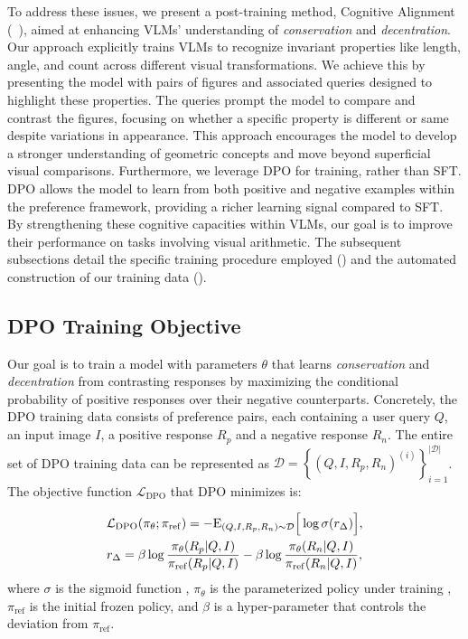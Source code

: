To address these issues, we present a post-training method, Cognitive Alignment (\method~), aimed at enhancing VLMs' understanding of \textit{conservation} and \textit{decentration}. Our approach %
explicitly trains VLMs to recognize invariant properties like length, angle, and count across different visual transformations. We achieve this by presenting the model with pairs of figures and associated queries designed to highlight these properties. The queries prompt the model to compare and contrast the figures, focusing on whether a specific property is different or same despite variations in appearance. This approach encourages the model to develop a stronger understanding of geometric concepts and move beyond superficial visual comparisons.
Furthermore, we leverage DPO \cite{rafailov2023dpo} for training, rather than SFT. DPO allows the model to learn from both positive and negative examples within the preference framework, providing a richer learning signal compared to SFT. By strengthening these cognitive capacities within VLMs, our goal is to improve their performance on tasks involving visual arithmetic. The subsequent subsections detail the specific training procedure employed () and the automated construction of our training data ().




\subsection{DPO Training Objective}

\label{subsec:training_setting}
Our goal is to train a model with parameters $\theta$ that learns \textit{conservation} and \textit{decentration} from contrasting responses by maximizing the conditional probability of positive responses over their negative counterparts. Concretely, the DPO training data consists of preference pairs, each containing a user query $Q$, an input image $I$, a positive response $R_p$ and a negative response $R_n$. The entire set of DPO training data can be represented as $\mathcal{D}=\left\{ \left(Q,I,R_p,R_n \right)^{(i)} \right\}_{i=1}^{\lvert \mathcal{D} \rvert}$. The objective function $\mathcal{L}_\mathrm{DPO}$ that DPO minimizes is:

\begin{align*}
\label{eq:dpo}
\small
&\mathcal{L}_\mathrm{DPO}(\pi_\theta;\pi_\mathrm{ref}) =-\mathrm{E}_{(Q,I, R_p,R_n)\sim \mathcal{D}}\Big[\log \sigma (r_{\Delta})\Big],\\
&r_{\Delta} = \beta \log\frac{\pi_\theta(R_p\vert Q, I)}{\pi_\mathrm{ref}(R_p\vert Q, I)} - \beta\log\frac{\pi_\theta(R_n\vert Q, I)}{\pi_\mathrm{ref}(R_n\vert Q, I)},
\end{align*}
where $\sigma$ is the sigmoid function%
, $\pi_{\theta}$ is the parameterized policy under training%
, $\pi_\mathrm{ref}$ is the initial frozen %
policy, and $\beta$ is a hyper-parameter that controls the deviation from $\pi_\mathrm{ref}$.


